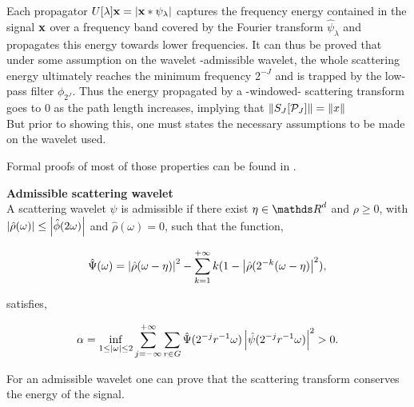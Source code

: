 \documentclass[a4paper,11pt]{report}
\begin{document}
			Each propagator $U[\lambda]{\bf x} = \left| {\bf x} \ast \psi_{\lambda} \right|$ captures the frequency energy contained in the signal ${\bf x}$ over a frequency band covered by the Fourier transform $\hat{\psi}_{\lambda}$ and propagates this energy towards lower frequencies. It can thus be proved that under some assumption on the wavelet -admissible wavelet, the whole scattering energy ultimately reaches the minimum frequency $2^{-J}$ and is trapped by the low-pass filter $\phi_{2^{J}}$. Thus the energy propagated by a -windowed- scattering transform goes to $0$ as the path length increases, implying that $\left\lVert S_{J}[\mathcal{P}_{J}] \right\rVert = \left\lVert x \right\rVert$\\
			
			But prior to showing this, one must states the necessary assumptions to be made on the wavelet used.
			
			\begin{note}
			  Formal proofs of most of those properties can be found in \cite{mallat2012gis}.
			\end{note}
			
			\begin{defn} \textbf{Admissible scattering wavelet}\\ 
				A scattering wavelet $\psi$ is admissible if there exist $\eta \in \dsR^{d}$ and $\rho \geq 0$, with $\left| \hat{\rho}(\omega) \right| \leq \left| \hat{\phi}(2\omega) \right|$ and $\hat{\rho}(\omega)=0$, such that the function,
				
				\begin{equation}
					\hat{\Psi}(\omega) = \left| \hat{\rho}(\omega - \eta) \right|^{2} - \sum_{k=1}^{+\infty}k(1-\left| \hat{\rho}(2^{-k}(\omega - \eta) \right|^{2}),
				\end{equation}
				
				satisfies,
				
				\begin{equation}
				  \alpha = \inf_{1 \leq \left| \omega \right|\leq 2} \sum_{j=-\infty}^{+\infty}\sum_{r \in G} \hat{\Psi}(2^{-j}r^{-1}\omega) \left| \hat{\psi}(2^{-j}r^{-1}\omega) \right|^{2} > 0.\\
				\end{equation}
				
				\label{def:Admissible wavelet}
			\end{defn}

			For an admissible wavelet one can prove that the scattering transform conserves the energy of the signal.
			
\end{document}
